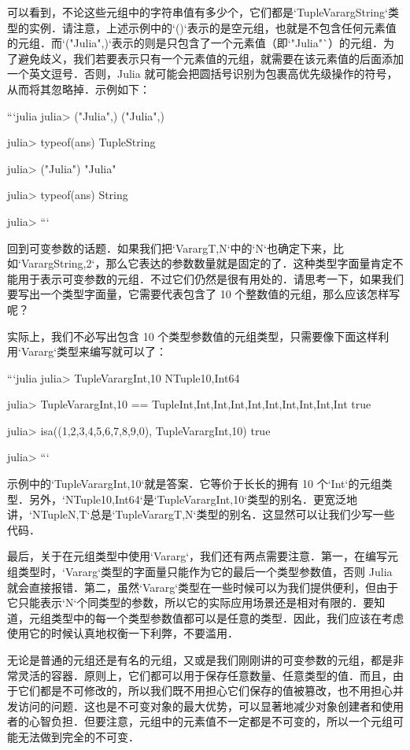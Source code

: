 可以看到，不论这些元组中的字符串值有多少个，它们都是`Tuple{Vararg{String}}`类型的实例．请注意，上述示例中的`()`表示的是空元组，也就是不包含任何元素值的元组．而`("Julia",)`表示的则是只包含了一个元素值（即`"Julia"`）的元组．为了避免歧义，我们若要表示只有一个元素值的元组，就需要在该元素值的后面添加一个英文逗号．否则，Julia 就可能会把圆括号识别为包裹高优先级操作的符号，从而将其忽略掉．示例如下：

```julia
julia> ("Julia",)
("Julia",)

julia> typeof(ans)
Tuple{String}

julia> ("Julia")
"Julia"

julia> typeof(ans)
String

julia> 
```

回到可变参数的话题．如果我们把`Vararg{T,N}`中的`N`也确定下来，比如`Vararg{String,2}`，那么它表达的参数数量就是固定的了．这种类型字面量肯定不能用于表示可变参数的元组．不过它们仍然是很有用处的．请思考一下，如果我们要写出一个类型字面量，它需要代表包含了 10 个整数值的元组，那么应该怎样写呢？

实际上，我们不必写出包含 10 个类型参数值的元组类型，只需要像下面这样利用`Vararg`类型来编写就可以了：

```julia
julia> Tuple{Vararg{Int,10}}
NTuple{10,Int64}

julia> Tuple{Vararg{Int,10}} == Tuple{Int,Int,Int,Int,Int,Int,Int,Int,Int,Int}
true

julia> isa((1,2,3,4,5,6,7,8,9,0), Tuple{Vararg{Int,10}})
true

julia> 
```

示例中的`Tuple{Vararg{Int,10}}`就是答案．它等价于长长的拥有 10 个`Int`的元组类型．另外，`NTuple{10,Int64}`是`Tuple{Vararg{Int,10}}`类型的别名．更宽泛地讲，`NTuple{N,T}`总是`Tuple{Vararg{T,N}}`类型的别名．这显然可以让我们少写一些代码．

最后，关于在元组类型中使用`Vararg`，我们还有两点需要注意．第一，在编写元组类型时，`Vararg`类型的字面量只能作为它的最后一个类型参数值，否则 Julia 就会直接报错．第二，虽然`Vararg`类型在一些时候可以为我们提供便利，但由于它只能表示`N`个同类型的参数，所以它的实际应用场景还是相对有限的．要知道，元组类型中的每一个类型参数值都可以是任意的类型．因此，我们应该在考虑使用它的时候认真地权衡一下利弊，不要滥用．

无论是普通的元组还是有名的元组，又或是我们刚刚讲的可变参数的元组，都是非常灵活的容器．原则上，它们都可以用于保存任意数量、任意类型的值．而且，由于它们都是不可修改的，所以我们既不用担心它们保存的值被篡改，也不用担心并发访问的问题．这也是不可变对象的最大优势，可以显著地减少对象创建者和使用者的心智负担．但要注意，元组中的元素值不一定都是不可变的，所以一个元组可能无法做到完全的不可变．